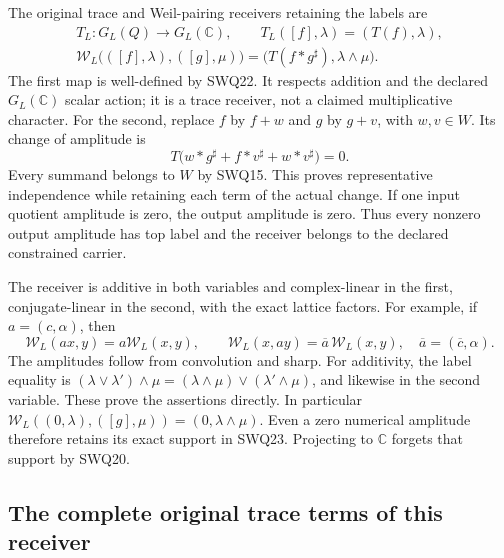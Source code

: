 The original trace and Weil-pairing receivers retaining the labels are
\begin{equation}\tag{SWQ23}
\begin{gathered}
 T_L:G_L(Q)\longrightarrow G_L(\mathbb C),\qquad
 T_L([f],\lambda)=(T(f),\lambda),\\
 \mathcal W_L\bigl(([f],\lambda),([g],\mu)\bigr)
   =\bigl(T(f*g^{\sharp}),\lambda\wedge\mu\bigr).
\end{gathered}
\end{equation}
The first map is well-defined by SWQ22. It respects addition and
the declared $G_L(\mathbb C)$ scalar action; it is a trace receiver,
not a claimed multiplicative character. For the second, replace
$f$ by $f+w$ and $g$ by $g+v$, with $w,v\in W$. Its change of
amplitude is
\begin{equation}\tag{SWQ24}
 T\bigl(w*g^{\sharp}+f*v^{\sharp}+w*v^{\sharp}\bigr)=0.
\end{equation}
Every summand belongs to $W$ by SWQ15. This proves representative
independence while retaining each term of the actual change.
If one input quotient amplitude is zero, the output amplitude is
zero. Thus every nonzero output amplitude has top label and the
receiver belongs to the declared constrained carrier.

The receiver is additive in both variables and complex-linear in
the first, conjugate-linear in the second, with the exact lattice
factors. For example, if $a=(c,\alpha)$, then
\begin{equation}\tag{SWQ25}
 \mathcal W_L(ax,y)=a\mathcal W_L(x,y),\qquad
 \mathcal W_L(x,ay)=\overline a\,\mathcal W_L(x,y),
 \quad\overline a=(\overline c,\alpha).
\end{equation}
The amplitudes follow from convolution and sharp. For additivity,
the label equality is
$(\lambda\vee\lambda')\wedge\mu
=(\lambda\wedge\mu)\vee(\lambda'\wedge\mu)$, and likewise in
the second variable. These prove the assertions directly.
In particular
$\mathcal W_L((0,\lambda),([g],\mu))=(0,\lambda\wedge\mu)$.
Even a zero numerical amplitude therefore retains its exact support
in SWQ23. Projecting to $\mathbb C$ forgets that support by SWQ20.

\subsection{The complete original trace terms of this receiver}

